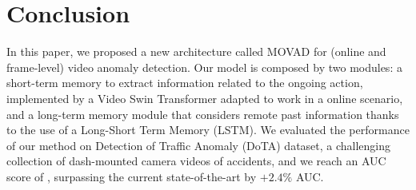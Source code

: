 \section{Conclusion}
\label{sec:conclusions}

In this paper, we proposed a new architecture called MOVAD for (online and frame-level) video anomaly detection.
Our model is composed by two modules: a short-term memory to extract information related to the ongoing action, implemented by a Video Swin Transformer adapted to work in a online scenario, and a long-term memory module that considers remote past information thanks to the use of a Long-Short Term Memory (LSTM).
We evaluated the performance of our method on Detection of Traffic Anomaly (DoTA) dataset, a challenging collection of dash-mounted camera videos of accidents, and we reach an AUC score of , surpassing the current state-of-the-art by $+2.4\%$ AUC.
